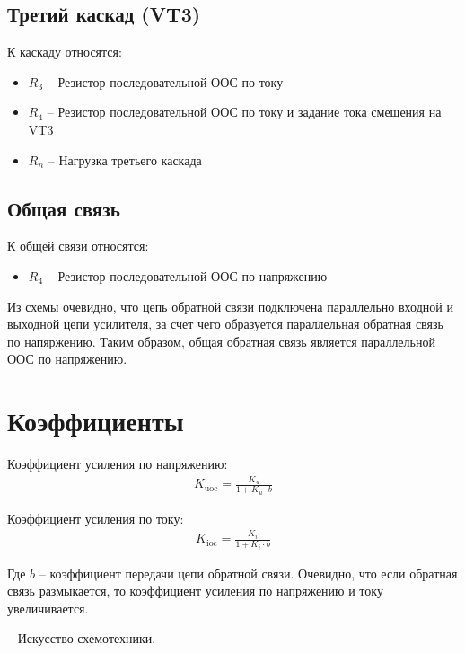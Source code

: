 \documentclass{labreport}
\begin{document}
\subsection{Третий каскад (VT3)}
К каскаду относятся:
\begin{itemize}
    \item $R_3$ -- Резистор последовательной ООС по току
    \item $R_4$ -- Резистор последовательной ООС по току и задание тока смещения на VT3
    \item $R_n$ -- Нагрузка третьего каскада
\end{itemize}


\subsection{Общая связь}
К общей связи относятся:
\begin{itemize}
    \item $R_4$ -- Резистор последовательной ООС по напряжению
    
\end{itemize}



Из схемы очевидно, что цепь обратной связи подключена параллельно входной и выходной цепи усилителя, за счет чего образуется параллельная обратная связь по напяржению. 
Таким образом, общая обратная связь является параллельной ООС по напряжению. 

\section{Коэффициенты}

Коэффициент усиления по напряжению:
\begin{gather*}
    K_\text{uoc} = \frac{K_u}{1+K_u\cdot b}
\end{gather*}

Коэффициент усиления по току:
\begin{gather*}
    K_\text{ioc} = \frac{K_i}{1+K_i\cdot b}
\end{gather*}

Где $b$ -- коэффициент передачи цепи обратной связи. Очевидно, что если обратная связь размыкается, то коэффициент усиления по напряжению и току увеличивается.

 -- Искусство схемотехники.
\end{document}
